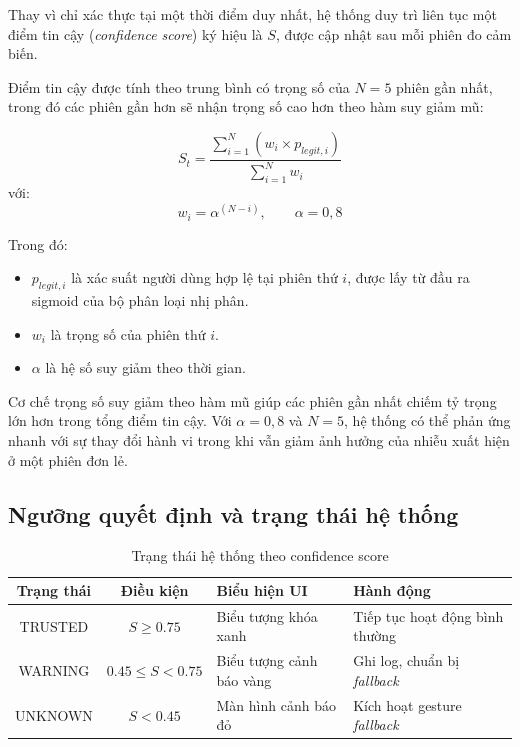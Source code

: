 \documentclass[../DoAn.tex]{subfiles}
\begin{document}
    Thay vì chỉ xác thực tại một thời điểm duy nhất, hệ thống duy trì liên tục một điểm tin cậy (\textit{confidence score}) ký hiệu là $S$, được cập nhật sau mỗi phiên đo cảm biến.
    
    Điểm tin cậy được tính theo trung bình có trọng số của $N = 5$ phiên gần nhất, trong đó các phiên gần hơn sẽ nhận trọng số cao hơn theo hàm suy giảm mũ:
    
    \[
    S_t =
    \frac{
    \sum_{i=1}^{N} \left( w_i \times p_{legit,i} \right)
    }{
    \sum_{i=1}^{N} w_i
    }
    \]
    với:
    \[
    w_i = \alpha^{(N-i)}, \qquad \alpha = 0,8
    \]
    
    Trong đó:
    \begin{itemize}
        \item $p_{legit,i}$ là xác suất người dùng hợp lệ tại phiên thứ $i$, được lấy từ đầu ra sigmoid của bộ phân loại nhị phân.
        
        \item $w_i$ là trọng số của phiên thứ $i$.
        
        \item $\alpha$ là hệ số suy giảm theo thời gian.
    \end{itemize}
    
    Cơ chế trọng số suy giảm theo hàm mũ giúp các phiên gần nhất chiếm tỷ trọng lớn hơn trong tổng điểm tin cậy. Với $\alpha = 0,8$ và $N = 5$, hệ thống có thể phản ứng nhanh với sự thay đổi hành vi trong khi vẫn giảm ảnh hưởng của nhiễu xuất hiện ở một phiên đơn lẻ.
    
    \subsection{Ngưỡng quyết định và trạng thái hệ thống}
    
    \begin{table}[H]
    \centering
    \caption{Trạng thái hệ thống theo confidence score}
    \label{tab:confidence_state}
    \renewcommand{\arraystretch}{1.3}
    
    \begin{tabular}{|c|c|p{3.2cm}|p{3.5cm}|}
    \hline
    \centering\textbf{Trạng thái} &
    \centering\textbf{Điều kiện} &
    \centering\arraybackslash\textbf{Biểu hiện UI} &
    \centering\arraybackslash\textbf{Hành động} \\
    \hline
    
    TRUSTED 
    & $S \geq 0.75$ 
    & Biểu tượng khóa xanh 
    & Tiếp tục hoạt động bình thường \\
    \hline
    
    WARNING 
    & $0.45 \leq S < 0.75$ 
    & Biểu tượng cảnh báo vàng 
    & Ghi log, chuẩn bị \textit{fallback} \\
    \hline
    
    UNKNOWN 
    & $S < 0.45$ 
    & Màn hình cảnh báo đỏ 
    & Kích hoạt gesture \textit{fallback} \\
    \hline
    
    \end{tabular}
    \end{table}
    
\end{document}
